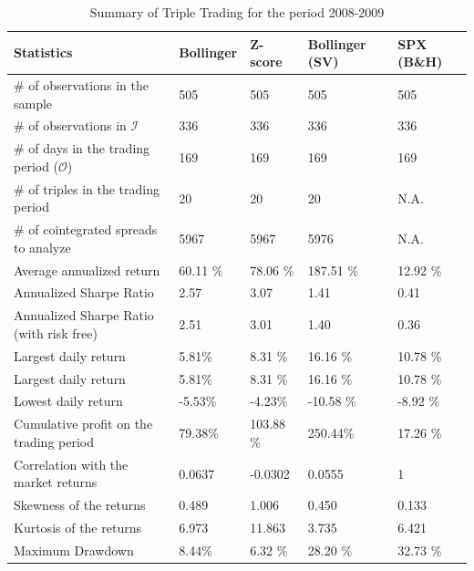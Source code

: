 \documentclass[11pt,a4,twosided,singlespacing,titlepagenumber=on]{scrreprt}
\numberwithin{equation}{chapter} %
\theoremstyle{remark}
\begin{document}
\renewcommand{\arraystretch}{1}%
\begin{table}[H]
\centering
\begin{tabular}{lllll}
\hline
Statistics  			& Bollinger & Z-score & Bollinger (SV) & SPX (B\&H)\\
\hline
\# of observations in the sample								    & 505       &505      & 505    & 505\\
\# of observations in $\mathcal{I}$						      & 336       &336      & 336    & 336\\
\# of days in the trading period ($\mathcal{O}$)    & 169       &169      & 169    & 169\\
\# of triples in the trading period   							& 20        &20       & 20     & N.A.\\
\# of cointegrated spreads to analyze 				      & 5967      &5967     & 5976   & N.A.\\
Average annualized return 										      & 60.11 \%  &78.06 \% & 187.51 \%& 12.92 \%\\
Annualized Sharpe Ratio 										        & 2.57      &3.07     & 1.41   & 0.41\\
Annualized Sharpe Ratio (with risk free)            & 2.51      &3.01     & 1.40   & 0.36\\
Largest daily return 											          & 5.81\%    &8.31 \%  & 16.16 \% & 10.78 \%\\
Largest daily return 											          & 5.81\%    &8.31 \%  & 16.16 \% & 10.78 \%\\
Lowest daily return 											          & -5.53\%   &-4.23\%  & -10.58 \% & -8.92 \%\\
Cumulative profit on the trading period             & 79.38\%   &103.88 \%& 250.44\% & 17.26 \% \\
Correlation with the market returns 							  & 0.0637    &-0.0302  & 0.0555 & 1\\
Skewness of the returns														  & 0.489     &1.006    & 0.450 & 0.133\\
Kurtosis of the returns														  & 6.973     &11.863   & 3.735 & 6.421 \\
Maximum Drawdown  												          & 8.44\%    &6.32 \%  & 28.20 \% & 32.73 \%\\
\hline
\end{tabular}
\caption{Summary of Triple Trading for the period 2008-2009}
\label{tab:valuation_portfolio_2008_2009}
\end{table}

\end{document}
